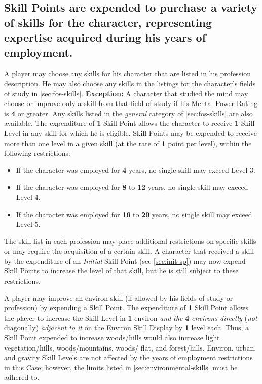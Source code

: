 \subsection[Skill Points]{Skill Points are expended to purchase a
  variety of skills 
  for the character, representing expertise acquired during his years
  of employment.}
\label{sec:skill-points-are}


A player may choose any skills for his character that are listed in
his profession description. He may also choose any skills in the
listings for the character's fields of study in \ref{sec:fos-skills}.
\textbf{Exception:} A character that studied the mind may choose or
improve only a skill from that field of study if his Mental Power
Rating is \textbf{4} or greater. Any skills listed in the
\emph{general} category of \ref{sec:fos-skills} are also available.
The expenditure of \textbf{1} Skill Point allows the character to
receive \textbf{1} Skill Level in any skill for which he is eligible.
Skill Points may be expended to receive more than one level in a given
skill (at the rate of \textbf{1} point per level), within the
following restrictions:

\begin{itemize}
\item If the character was employed for \textbf{4} years, no single
  skill may exceed Level 3.
\item If the character was employed for \textbf{8} to \textbf{12}
  years, no single skill may exceed Level 4.
\item If the character was employed for \textbf{16} to \textbf{20}
  years, no single skill may exceed Level 5.
\end{itemize}

The skill list in each profession may place additional restrictions on
specific skills or may require the acquisition of a certain skill. A
character that received a skill by the expenditure of an
\emph{Initial} Skill Point (see \ref{sec:init-sp}) may now expend
Skill Points to increase the level of that skill, but he is still
subject to these restrictions.

A player may improve an environ skill (if allowed by his fields of
study or profession) by expending a Skill Point. The expenditure of
\textbf{1} Skill Point allows the player to increase the Skill Level
in \textbf{1} environ \emph{and the} \textbf{4} \emph{environs
  directly} (\emph{not} diagonally) \emph{adjacent to it} on the
Environ Skill Display by \textbf{1} level each. Thus, a Skill Point
expended to increase woods/hills would also increase light
vegetation/hills, woods/mountains, woods/ flat, and forest/hills.
Environ, urban, and gravity Skill Levels are not affected by the years
of employment restrictions in this Case; however, the limits listed in
\ref{sec:environmental-skills} must be adhered to.


